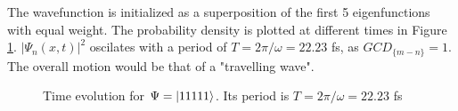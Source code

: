 \documentclass{cis320}
\begin{document}
The wavefunction is initialized as a superposition of the first 5 eigenfunctions with equal weight. The probability density is plotted at different times in Figure \ref{fig:H11111}. $|\Psi_{n}(x,t)|^2$ oscilates with a period of $T=2\pi/\omega=22.23$ fs, as $GCD_{\{m-n\}}=1$. The overall motion would be that of a "travelling wave".
\begin{figure}[h!]
    \centering
    \caption{Time evolution for $\Psi = \ket{11111}$. Its period is $T=2\pi/\omega=22.23$ fs}
    \label{fig:H11111}
\end{figure}
\end{document}
